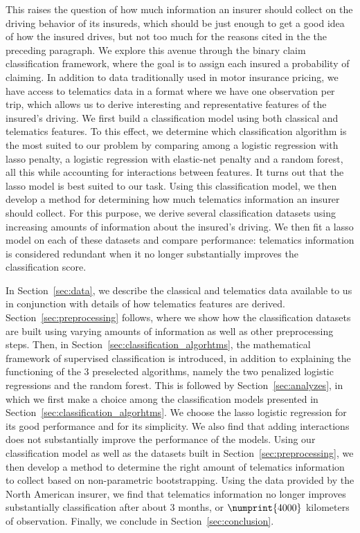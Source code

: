 \documentclass{article}
\begin{document}
This raises the question of how much information an insurer should collect on the driving behavior of its insureds, which should be just enough to get a good idea of how the insured drives, but not too much for the reasons cited in the the preceding paragraph. We explore this avenue through the binary claim classification framework, where the goal is to assign each insured a probability of claiming. In addition to data traditionally used in motor insurance pricing, we have access to telematics data in a format where we have one observation per trip, which allows us to derive interesting and representative features of the insured's driving. We first build a classification model using both classical and telematics features. To this effect, we determine which classification algorithm is the most suited to our problem by comparing among a logistic regression with lasso penalty, a logistic regression with elastic-net penalty and a random forest, all this while accounting for interactions between features. It turns out that the lasso model is best suited to our task. Using this classification model, we then develop a method for determining how much telematics information an insurer should collect. For this purpose, we derive several classification datasets using increasing amounts of information about the insured's driving. We then fit a lasso model on each of these datasets and compare performance: telematics information is considered redundant when it no longer substantially improves the classification score.

In Section~\ref{sec:data}, we describe the classical and telematics data available to us in conjunction with details of how telematics features are derived. Section~\ref{sec:preprocessing} follows, where we show how the classification datasets are built using varying amounts of information as well as other preprocessing steps. Then, in Section~\ref{sec:classification_algorhtms}, the mathematical framework of supervised classification is introduced, in addition to explaining the functioning of the $3$ preselected algorithms, namely the two penalized logistic regressions and the random forest. This is followed by Section~\ref{sec:analyzes}, in which we first make a choice among the classification models presented in Section~\ref{sec:classification_algorhtms}. We choose the lasso logistic regression for its good performance and for its simplicity. We also find that adding interactions does not substantially improve the performance of the models. Using our classification model as well as the datasets built in Section~\ref{sec:preprocessing}, we then develop a method to determine the right amount of telematics information to collect based on non-parametric bootstrapping. Using the data provided by the North American insurer, we find that telematics information no longer improves substantially classification after about $3$ months, or $\numprint{4000}$ kilometers of observation. Finally, we conclude in Section~\ref{sec:conclusion}.
\end{document}
